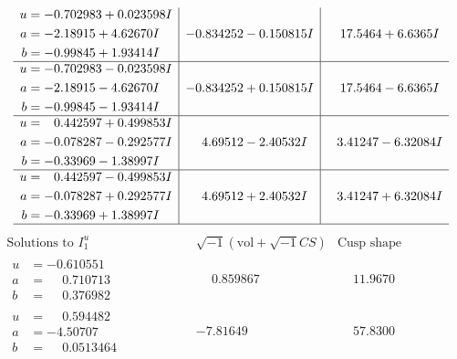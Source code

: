 \documentclass[1p]{elsarticle_modified}
\theoremstyle{definition}
\newcommand{\I}{\sqrt{-1}}
\begin{document}
$$\begin{array}{c|c|c}
\begin{aligned}
u &= -0.702983 + 0.023598 I \\
a &= -2.18915 + 4.62670 I \\
b &= -0.99845 + 1.93414 I\end{aligned}
 & -0.834252 - 0.150815 I & \phantom{-}17.5464 + 6.6365 I \\ \hline\begin{aligned}
u &= -0.702983 - 0.023598 I \\
a &= -2.18915 - 4.62670 I \\
b &= -0.99845 - 1.93414 I\end{aligned}
 & -0.834252 + 0.150815 I & \phantom{-}17.5464 - 6.6365 I \\ \hline\begin{aligned}
u &= \phantom{-}0.442597 + 0.499853 I \\
a &= -0.078287 - 0.292577 I \\
b &= -0.33969 - 1.38997 I\end{aligned}
 & \phantom{-}4.69512 - 2.40532 I & \phantom{-}3.41247 - 6.32084 I \\ \hline\begin{aligned}
u &= \phantom{-}0.442597 - 0.499853 I \\
a &= -0.078287 + 0.292577 I \\
b &= -0.33969 + 1.38997 I\end{aligned}
 & \phantom{-}4.69512 + 2.40532 I & \phantom{-}3.41247 + 6.32084 I\\
 \hline 
 \end{array}$$\newpage$$\begin{array}{c|c|c}  
\text{Solutions to }I^u_{1}& \I (\text{vol} + \sqrt{-1}CS) & \text{Cusp shape}\\
 \hline 
\begin{aligned}
u &= -0.610551\phantom{ +0.000000I} \\
a &= \phantom{-}0.710713\phantom{ +0.000000I} \\
b &= \phantom{-}0.376982\phantom{ +0.000000I}\end{aligned}
 & \phantom{-}0.859867\phantom{ +0.000000I} & \phantom{-}11.9670\phantom{ +0.000000I} \\ \hline\begin{aligned}
u &= \phantom{-}0.594482\phantom{ +0.000000I} \\
a &= -4.50707\phantom{ +0.000000I} \\
b &= \phantom{-}0.0513464\phantom{ +0.000000I}\end{aligned}
 & -7.81649\phantom{ +0.000000I} & \phantom{-}57.8300\phantom{ +0.000000I} \\ \hline\begin{aligned}

\end{aligned}
\end{array}$$
\end{document}

